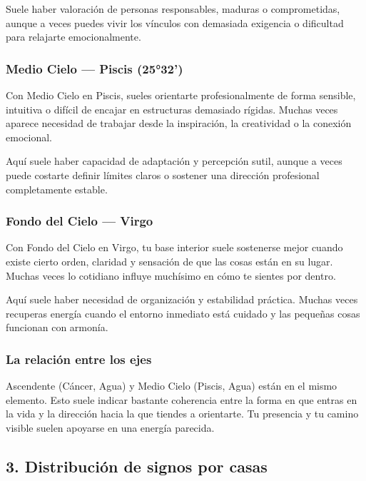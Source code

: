 \documentclass[11pt,a4paper]{article}
\begin{document}
Suele haber valoración de personas responsables, maduras o comprometidas, aunque a veces puedes vivir los vínculos con demasiada exigencia o dificultad para relajarte emocionalmente.

\subsubsection*{Medio Cielo — Piscis (25°32')}
Con Medio Cielo en Piscis, sueles orientarte profesionalmente de forma sensible, intuitiva o difícil de encajar en estructuras demasiado rígidas. Muchas veces aparece necesidad de trabajar desde la inspiración, la creatividad o la conexión emocional.

Aquí suele haber capacidad de adaptación y percepción sutil, aunque a veces puede costarte definir límites claros o sostener una dirección profesional completamente estable.

\subsubsection*{Fondo del Cielo — Virgo}
Con Fondo del Cielo en Virgo, tu base interior suele sostenerse mejor cuando existe cierto orden, claridad y sensación de que las cosas están en su lugar. Muchas veces lo cotidiano influye muchísimo en cómo te sientes por dentro.

Aquí suele haber necesidad de organización y estabilidad práctica. Muchas veces recuperas energía cuando el entorno inmediato está cuidado y las pequeñas cosas funcionan con armonía.

\subsubsection*{La relación entre los ejes}
Ascendente (Cáncer, Agua) y Medio Cielo (Piscis, Agua) están en el mismo elemento. Esto suele indicar bastante coherencia entre la forma en que entras en la vida y la dirección hacia la que tiendes a orientarte. Tu presencia y tu camino visible suelen apoyarse en una energía parecida.

\vspace{0.5cm}

\subsection{3. Distribución de signos por casas}
\end{document}
